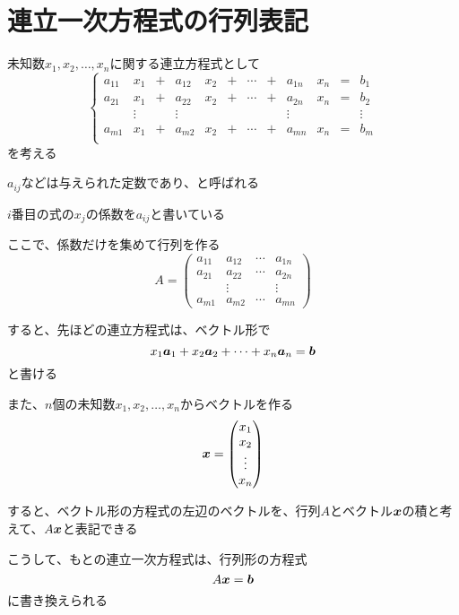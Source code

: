 \documentclass[../../../topic_linear-algebra]{subfiles}
\begin{document}
\sectionline
\section{連立一次方程式の行列表記}

未知数$x_1, x_2, \dots, x_n$に関する連立方程式として
\begin{equation*}
  \left\{
  \begin{alignedat}{12}
    a_{11} & x_1    & {}+{} & a_{12} & x_2 & {}+{} & \cdots & {}+{} & a_{1n} & x_n & {}={} & b_1    \\
    a_{21} & x_1    & {}+{} & a_{22} & x_2 & {}+{} & \cdots & {}+{} & a_{2n} & x_n & {}={} & b_2    \\
           & \vdots &       & \vdots &     &       &        &       & \vdots &     &       & \vdots \\
    a_{m1} & x_1    & {}+{} & a_{m2} & x_2 & {}+{} & \cdots & {}+{} & a_{mn} & x_n & {}={} & b_m    \\
  \end{alignedat}
  \right.
\end{equation*}
を考える

$a_{ij}$などは与えられた定数であり、と呼ばれる

$i$番目の式の$x_j$の係数を$a_{ij}$と書いている

\br

ここで、係数だけを集めて行列を作る
\begin{equation*}
  A = \begin{pmatrix}
    a_{11} & a_{12} & \cdots & a_{1n} \\
    a_{21} & a_{22} & \cdots & a_{2n} \\
           & \vdots &        & \vdots \\
    a_{m1} & a_{m2} & \cdots & a_{mn}
  \end{pmatrix}
\end{equation*}

すると、先ほどの連立方程式は、ベクトル形で
\begin{equation*}
  x_1 \vb*{a}_1 + x_2 \vb*{a}_2 + \cdots + x_n \vb*{a}_n = \vb*{b}
\end{equation*}
と書ける

\br

また、$n$個の未知数$x_1, x_2, \dots, x_n$からベクトルを作る
\begin{equation*}
  \vb*{x} = \begin{pmatrix}
    x_1    \\
    x_2    \\
    \vdots \\
    x_n
  \end{pmatrix}
\end{equation*}

すると、ベクトル形の方程式の左辺のベクトルを、行列$A$とベクトル$\vb*{x}$の積と考えて、$A\vb*{x}$と表記できる

こうして、もとの連立一次方程式は、行列形の方程式
\begin{equation*}
  A\vb*{x} = \vb*{b}
\end{equation*}
に書き換えられる
\end{document}
